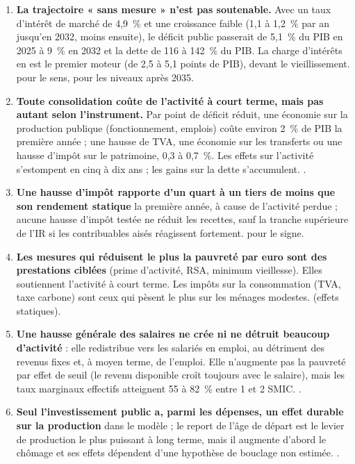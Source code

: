 \begin{enumerate}
\item \textbf{La trajectoire « sans mesure » n'est pas soutenable.} Avec un taux d'intérêt de marché de 4,9~\% et une
croissance faible (1,1 à 1,2~\% par an jusqu'en 2032, moins ensuite), le déficit public passerait de 5,1~\% du PIB en 2025 à
9~\% en 2032 et la dette de 116 à 142~\% du PIB. La charge d'intérêts en est le premier moteur (de 2,5 à 5,1 points de PIB),
devant le vieillissement.  pour le sens,  pour les niveaux après 2035.
\item \textbf{Toute consolidation coûte de l'activité à court terme, mais pas autant selon l'instrument.} Par point de
déficit réduit, une économie sur la production publique (fonctionnement, emplois) coûte environ 2~\% de PIB la première
année ; une hausse de TVA, une économie sur les transferts ou une hausse d'impôt sur le patrimoine, 0,3 à 0,7~\%. Les
effets sur l'activité s'estompent en cinq à dix ans ; les gains sur la dette s'accumulent. .
\item \textbf{Une hausse d'impôt rapporte d'un quart à un tiers de moins que son rendement statique} la première année,
à cause de l'activité perdue ; aucune hausse d'impôt testée ne réduit les recettes, sauf la tranche supérieure de l'IR si
les contribuables aisés réagissent fortement.  pour le signe.
\item \textbf{Les mesures qui réduisent le plus la pauvreté par euro sont des prestations ciblées} (prime d'activité, RSA,
minimum vieillesse). Elles soutiennent l'activité à court terme. Les impôts sur la consommation (TVA, taxe carbone) sont
ceux qui pèsent le plus sur les ménages modestes.  (effets statiques).
\item \textbf{Une hausse générale des salaires ne crée ni ne détruit beaucoup d'activité} : elle redistribue vers les
salariés en emploi, au détriment des revenus fixes et, à moyen terme, de l'emploi. Elle n'augmente pas la pauvreté par
effet de seuil (le revenu disponible croît toujours avec le salaire), mais les taux marginaux effectifs atteignent 55 à
82~\% entre 1 et 2 SMIC. .
\item \textbf{Seul l'investissement public a, parmi les dépenses, un effet durable sur la production} dans le modèle ;
le report de l'âge de départ est le levier de production le plus puissant à long terme, mais il augmente d'abord le
chômage et ses effets dépendent d'une hypothèse de bouclage non estimée. .

\end{enumerate}

